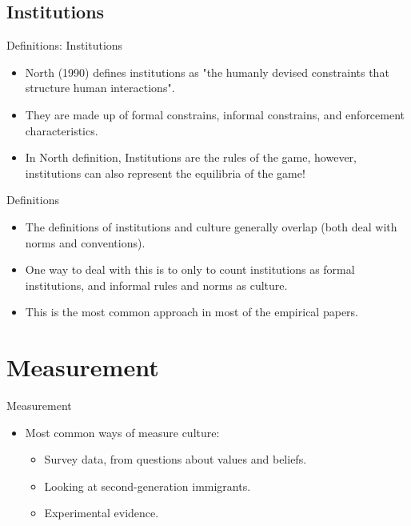 \documentclass{beamer}
\begin{document}
    \subsection{Institutions}
        \begin{frame}{Definitions: Institutions}
    \begin{itemize}
        \item North (1990) defines institutions as "the humanly devised constraints that structure human interactions".
        \vspace{0.3cm}
        \pause 
\item They are made up of formal constrains, informal constrains, and enforcement characteristics.   
        \vspace{0.3cm}
        \pause
\item In North definition, Institutions are the rules of the game, however, institutions can also represent the equilibria of the game!  

            \end{itemize}
    \end{frame}

            \begin{frame}{Definitions}
    \begin{itemize}
        \item The definitions of institutions and culture generally overlap (both deal with norms and conventions).
        \vspace{0.3cm}
        \pause 
         \item One way to deal with this is to only to count institutions as formal institutions, and informal rules and norms as culture.
           \vspace{0.3cm}
        \pause 
        \item This is the most common approach in most of the empirical papers.
            \end{itemize}
    \end{frame}
    \section{Measurement}
    \begin{frame}{Measurement}
    \begin{itemize}
        \item Most common ways of measure culture:
          \vspace{0.5cm}
        \pause
        \begin{itemize}
            \item Survey data, from questions about values and beliefs.
                       \vspace{0.3cm}
        \pause 
        \item Looking at second-generation immigrants.
                       \vspace{0.3cm}
        \pause 
        \item Experimental evidence.
        \end{itemize}
    \end{itemize}

\end{frame}
\end{document}
